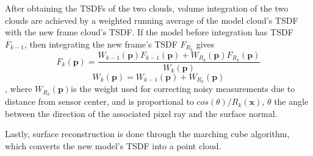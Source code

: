 \documentclass{ut-thesis}
\begin{document}
After obtaining the TSDFs of the two clouds, volume integration of the two clouds are achieved by a weighted running average of the model cloud's TSDF with the new frame cloud's TSDF.
If the model before integration has TSDF \(F_{k-1}\), then integrating the new frame's TSDF \(F_{R_k}\) gives
\[  F_k(\textbf{p}) = \frac{W_{k-1}(\textbf{p}) F_{k-1}(\textbf{p}) + W_{R_k}(\textbf{p}) F_{R_k}(\textbf{p})} {W_k(\textbf{p})}   \]
\[  W_k(\textbf{p}) = W_{k-1}(\textbf{p}) + W_{R_k}(\textbf{p})  \]
, where \( W_{R_k}(\textbf{p}) \)is the weight used for correcting noisy measurements due to distance from sensor center, and is proportional to \( cos(\theta)/R_k(\textbf{x}) \), \(\theta\) the angle between the direction of the associated pixel ray and the surface normal.

Lastly, surface reconstruction is done through the marching cube algorithm, which converts the new model's TSDF into a point cloud.



\end{document}
